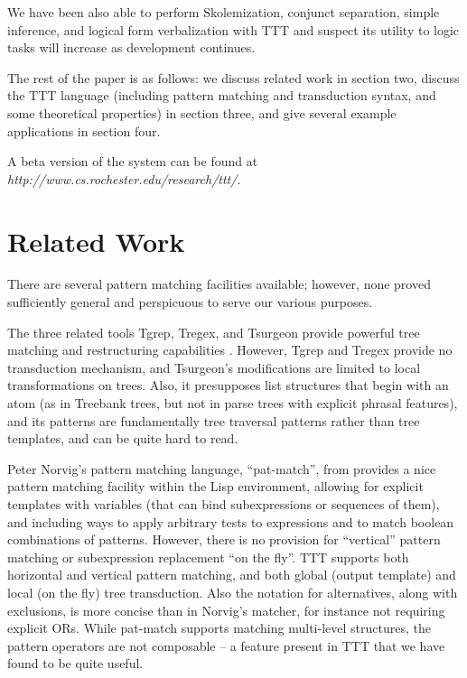 \documentclass[a4,11pt]{article}
\begin{document}
We have been also able to perform Skolemization, conjunct separation, simple inference, and logical form verbalization with TTT and suspect its utility to logic tasks will increase as development continues.

The rest of the paper is as follows: we discuss related work in section two, discuss the TTT language (including pattern matching and transduction syntax, and some theoretical properties) in section three, and give several example applications in section four.

A beta version of the system can be found at {\em http://www.cs.rochester.edu/research/ttt/}.


\section{Related Work}
There are several pattern matching facilities available; however, none proved sufficiently general and perspicuous to serve our various purposes.

The three related tools Tgrep, Tregex, and Tsurgeon provide powerful tree matching and restructuring capabilities \cite{Levy-Andrew:2006}. However, Tgrep and Tregex provide no transduction mechanism, and Tsurgeon's modifications are limited to local transformations on trees. Also, it presupposes list structures that begin with an atom (as in Treebank trees, but not in parse trees with explicit phrasal features), and its patterns are fundamentally tree traversal patterns rather than tree templates, and can be quite hard to read. 

Peter Norvig's pattern matching language, ``pat-match'', from \cite{Norvig:1991} provides a nice pattern matching facility within the Lisp environment, allowing for explicit templates with variables (that can bind subexpressions or sequences of them), and including ways to apply arbitrary tests to expressions and to match boolean combinations of patterns. However, there is no provision for ``vertical'' pattern matching or subexpression replacement ``on the fly''. TTT supports both horizontal and vertical pattern matching, and both global (output template) and local (on the fly) tree transduction. Also the notation for alternatives, along with exclusions, is more concise than in Norvig's matcher, for instance not requiring explicit ORs. While pat-match supports matching multi-level structures, the pattern operators are not composable -- a feature present in TTT that we have found to be quite useful.  
\end{document}
